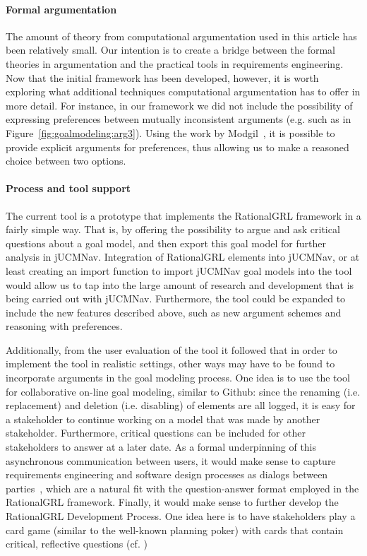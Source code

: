 \paragraph{Formal argumentation}
The amount of theory from computational argumentation used in this article has been relatively small. Our intention is to create a bridge between the formal theories in argumentation and the practical tools in requirements engineering. Now that the initial framework has been developed, however, it is worth exploring what additional techniques computational argumentation has to offer in more detail. For instance, in our framework we did not include the possibility of expressing preferences between mutually inconsistent arguments (e.g. such as in Figure~\ref{fig:goalmodeling:arg3}). Using the work by Modgil~\cite{modgil2009}, it is possible to provide explicit arguments for preferences, thus allowing us to make a reasoned choice between two options. 

\paragraph{Process and tool support}
The current tool is a prototype that implements the RationalGRL framework in a fairly simple way. That is, by offering the possibility to argue and ask critical questions about a goal model, and then export this goal model for further analysis in jUCMNav. Integration of RationalGRL elements into jUCMNav, or at least creating an import function to import jUCMNav goal models into the tool would allow us to tap into the large amount of research and development that is being carried out with jUCMNav. Furthermore, the tool could be expanded to include the new features described above, such as new argument schemes and reasoning with preferences. 

Additionally, from the user evaluation of the tool it followed that in order to implement the tool in realistic settings, other ways may have to be found to incorporate arguments in the goal modeling process. One idea is to use the tool for collaborative on-line goal modeling, similar to Github: since the renaming (i.e. replacement) and deletion (i.e. disabling) of elements are all logged, it is easy for a stakeholder to continue working on a model that was made by another stakeholder. Furthermore, critical questions can be included for other stakeholders to answer at a later date. As a formal underpinning of this asynchronous communication between users, it would make sense to capture requirements engineering and software design processes as dialogs between parties~\cite{finkelstein1989multiparty,BlackEtal2013}, which are a natural fit with the question-answer format employed in the RationalGRL framework. Finally, it would make sense to further develop the RationalGRL Development Process. One idea here is to have stakeholders play a card game (similar to the well-known planning poker) with cards that contain critical, reflective questions (cf. \cite{SchriekEtal2016})

